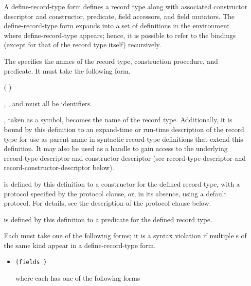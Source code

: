 \begin{entry}{%
}

A {\cf define-record-type} form defines a record type along with
associated constructor descriptor and constructor, predicate, field
accessors, and field mutators. The {\cf define-record-type} form expands into
a set of definitions in the environment where {\cf define-record-type}
appears; hence, it is possible to refer to the bindings (except for
that of the record type itself) recursively.

The  specifies the names of the record type,
construction procedure, and predicate. It must take the following
form.

\begin{scheme}
(  )
\end{scheme}

, , and  must all be identifiers.

, taken as a symbol, becomes the name of the record
type.  Additionally, it is bound by this definition to an expand-time
or run-time description of the record type for use as parent name in
syntactic record-type definitions that extend this definition. It may
also be used as a handle to gain access to the underlying record-type
descriptor and constructor descriptor (see {\cf
  record-type-descriptor} and {\cf record-constructor-descriptor}
below).

 is defined by this definition to a
constructor for the defined record type, with a protocol specified by
the {\cf protocol} clause, or, in its absence, using a default protocol. For
details, see the description of the {\cf protocol} clause below.

 is defined by this definition to a predicate
for the defined record type.

Each  must take one of the following forms; it is
a syntax violation if multiple s of the same kind appear in a
{\cf define-record-type} form.

\begin{itemize}
\item {\tt (fields )}
   
  where each  has one of the following forms
  

\end{itemize}
\end{entry}
